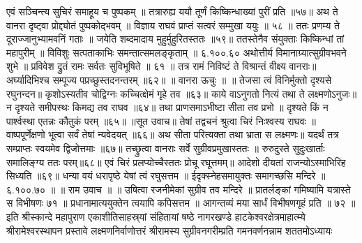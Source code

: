 एवं सञ्चिन्त्य सुचिरं समाहूय च पुष्पकम् ॥
तत्रारुह्य ययौ तूर्णं किष्किन्धाख्यां पुरीं प्रति ॥५७॥
अथ ते वानरा दृष्ट्वा प्रोद्द्योतं पुष्पकोद्भवम् ॥
विज्ञाय राघवं प्राप्तं सत्वरं सम्मुखा ययुः ॥ ५८ ॥
ततः प्रणम्य ते दूराज्जानुभ्यामवनिं गताः ॥
जयेति शब्दमादाय मुहुर्मुहुरितस्ततः ॥५९॥
ततस्तेनैव संयुक्ताः किष्किन्धां तां महापुरीम् ॥
विविशुः सत्पताकाभिः समन्तात्समलङ्कृताम् ॥ ६.१००.६०
अथोत्तीर्य विमानाग्र्यात्सुग्रीवभवने शुभे ॥
प्रविवेश द्रुतं रामः सर्वतः सुविभूषिते ॥ ६१ ॥
तत्र रामं निविष्टं ते विश्रान्तं वीक्ष्य वानराः॥
अर्घ्यादिभिश्च सम्पूज्य पप्रच्छुस्तदनन्तरम् ॥६२॥
॥ वानरा ऊचुः ॥ ॥
तेजसा त्वं विनिर्मुक्तो दृश्यसे रघुनन्दन॥
कृशोऽस्यतीव चोद्विग्नः कच्चित्क्षेमं गृहे तव ॥६३॥
काये वाऽनुगतो नित्यं तथा ते लक्ष्मणोऽनुजः॥
न दृश्यते समीपस्थः किमद्य तव राघव ॥६४॥
तथा प्राणसमाऽभीष्टा सीता तव प्रभो ॥
दृश्यते किं न पार्श्वस्था एतन्नः कौतुकं परम् ॥६५॥
॥सूत उवाच॥
तेषां तद्वचनं श्रुत्वा चिरं निःश्वस्य राघवः ॥
वाष्पपूर्णेक्षणो भूत्वा सर्वं तेषां न्यवेदयत् ॥६६॥
अथ सीता परित्यक्ता तथा भ्राता स लक्ष्मणः॥
यदर्थं तत्र सम्प्राप्तः स्वयमेव द्विजोत्तमाः ॥६७॥
तच्छ्रुत्वा वानराः सर्वे सुग्रीवप्रमुखास्ततः ॥
रुरुदुस्ते सुदुःखार्ताः समालिङ्ग्य ततः परम्॥६८॥
एवं चिरं प्रलप्योच्चैस्ततः प्रोचू रघूत्तमम्॥
आदेशो दीयतां राजन्योऽस्माभिरिह सिध्यति ॥६९॥
धन्या वयं धरापृष्ठे येषां त्वं रघुसत्तम ॥
ईदृक्स्नेहसमायुक्तः समागच्छसि मन्दिरे ॥ ६.१००.७० ॥
॥ राम उवाच ॥ ॥
उषित्वा रजनीमेकां सुग्रीव तव मन्दिरे ॥
प्रातर्लङ्कां गमिष्यामि यत्रास्ते स विभीषणः ७१ ॥
प्रधानामात्ययुक्तेन त्वयापि कपिसत्तम ॥
आगन्तव्यं मया सार्धं विभीषणगृहं प्रति ॥ ७२ ॥
इति श्रीस्कान्दे महापुराण एकाशीतिसाहस्र्यां संहितायां षष्ठे नागरखण्डे हाटकेश्वरक्षेत्रमाहात्म्ये श्रीरामेश्वरस्थापन प्रस्तावे लक्ष्मणनिर्वाणोत्तरं श्रीरामस्य सुग्रीवनगरीम्प्रति गमनवर्णनन्नाम शततमोऽध्यायः


